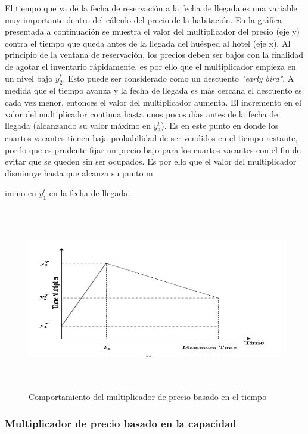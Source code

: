{El tiempo que va de la fecha de reservación a la fecha de llegada es una variable muy importante dentro del cálculo del precio de la habitación. En la gráfica presentada a continuación se muestra el valor del multiplicador del precio (eje y) contra el tiempo que queda antes de la llegada del huésped al hotel (eje x). Al principio de la ventana de reservación, los precios deben ser bajos con la finalidad de agotar el inventario rápidamente, es por ello que el multiplicador empieza en un nivel bajo $y_2^t$. Esto puede ser considerado como un descuento \emph{"early bird"}. A medida que el tiempo avanza y la fecha de llegada es más cercana el descuento es cada vez menor, entonces el valor del multiplicador aumenta. El incremento en el valor del multiplicador continua hasta unos pocos días antes de la fecha de llegada (alcanzando su valor máximo en $y_3^t$). Es en este punto en donde los cuartos vacantes tienen baja probabilidad de ser vendidos en el tiempo restante, por lo que es prudente fijar un precio bajo para los cuartos vacantes con el fin de evitar que se queden sin ser ocupados. Es por ello que el valor del multiplicador disminuye hasta que alcanza su punto m{inimo en $y_1^t$ en la fecha de llegada.

\begin{figure}[H]
  \centering
      \includegraphics[width=\maxwidth,height=8cm]{figures/Time_Mult.png} 
  \caption{Comportamiento del multiplicador de precio basado en el tiempo}
\end{figure}

\subsubsection*{Multiplicador de precio basado en la capacidad}

}}
